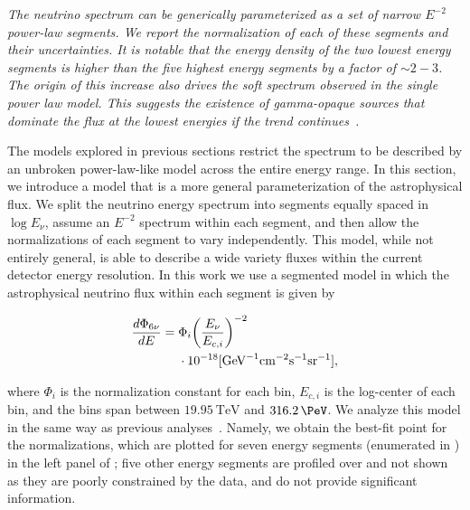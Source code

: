 \noindent
\textit{The neutrino spectrum can be generically parameterized as a set of narrow $E^{-2}$ power-law segments.
	We report the normalization of each of these segments and their uncertainties.
	It is notable that the energy density of the two lowest energy segments is higher than the five highest energy segments by a factor of $\sim 2-3$.
	The origin of this increase also drives the soft spectrum observed in the single power law model.
	This suggests the existence of gamma-opaque sources that dominate the flux at the lowest energies if the trend continues~\cite{Murase:2015xka,Ando:2015bva,Bechtol:2015uqb,Meszaros:2017fcs}.
}
\newline

The models explored in previous sections restrict the spectrum to be described by an unbroken power-law-like model across the entire energy range.
In this section, we introduce a model that is a more general parameterization of the astrophysical flux.
We split the neutrino energy spectrum into segments equally spaced in $\log E_\nu$, assume an $E^{-2}$ spectrum within each segment, and then allow the normalizations of each segment to vary independently.
This model, while not entirely general, is able to describe a wide variety fluxes within the current detector energy resolution.
In this work we use a segmented model in which the astrophysical neutrino flux within each segment is given by
\begin{linenomath*}
	\begin{align}
	\begin{split}
	\frac{d\Phi_{6\nu}}{dE} ={}& \Phi_{i} {\left(\frac{E_\nu}{E_{c,i}}\right)}^{-2}\\
	& \cdot 10^{-18}[\textmd{GeV}^{-1}\textmd{cm}^{-2}\textmd{s}^{-1}\textmd{sr}^{-1}],
	\label{eq:segmented_flux}
	\end{split}
	\end{align}
\end{linenomath*}
where $\Phi_i$ is the normalization constant for each bin, $E_{c,i}$ is the log-center of each bin, and the bins span between $\SI{19.95}\TeV$ and $\SI{316.2}\PeV$.
We analyze this model in the same way as previous analyses~\cite{Aartsen:2014gkd,Aartsen:2015zva,Aartsen:2017mau}.
Namely, we obtain the best-fit point for the normalizations, which are plotted for seven energy segments (enumerated in ) in the left panel of ; five other energy segments are profiled over and not shown as they are poorly constrained by the data, and do not provide significant information.
